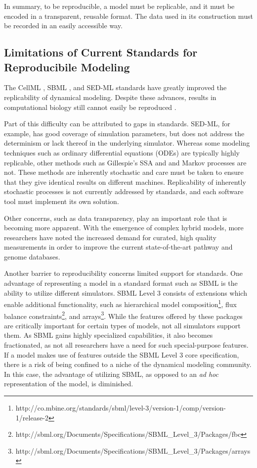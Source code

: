 \documentclass[journal,transmag,twoside]{IEEEtran}
\begin{document}
In summary, to be reproducible, a model must be replicable, and it must be encoded
in a transparent, reusable format. The data used in its construction must be
recorded in an easily accessible way.

\subsection{Limitations of Current Standards for Reproducibile Modeling}

The CellML \cite{cuellar2003overview}, SBML \cite{hucka2003}, and SED-ML \cite{sedml2011} standards have greatly improved the replicability of dynamical modeling.
Despite these advances, results in computational biology still cannot easily be reproduced \cite{garijo2013quantifying}.

Part of this difficulty can be attributed to gaps in standards.
SED-ML, for example, has good coverage of simulation parameters, but
does not address the determinism or lack thereof in the underlying simulator.
Whereas some modeling techniques such as ordinary differential equations (ODEs)
are typically highly replicable, other methods such as Gillespie's SSA and
and Markov processes are not. These methods are inherently stochastic and care
must be taken to ensure that they give identical results on different machines.
Replicability of inherently stochastic processes is not currently addressed by standards,
and each software tool must implement its own solution.

Other concerns, such as data transparency, play an important role that is becoming more apparent.
With the emergence of complex hybrid models, more researchers have noted the increased demand for curated, high quality measurements in order to improve the current state-of-the-art pathway and genome databases.

Another barrier to reproducibility concerns limited support for standards.
One advantage of representing a model in a standard format such as SBML is the ability
to utilize different simulators.
SBML Level 3 consists of extensions which enable additional
functionality, such as
hierarchical model composition\footnote{http://co.mbine.org/standards/sbml/level-3/version-1/comp/version-1/release-2},
flux balance constraints\footnote{ http://sbml.org/Documents/Specifications/SBML\_Level\_3/Packages/fbc}, and
arrays\footnote{http://sbml.org/Documents/Specifications/SBML\_Level\_3/Packages/arrays}.
While the features offered by these packages are critically important for certain
types of models, not all simulators support them.
As SBML gains highly specialized capabilities, it also becomes fractionated, as
not all researchers have a need for such special-purpose features.
If a model makes use of features outside the SBML Level 3 core specification,
there is a risk of being confined to a niche of the dynamical modeling community.
In this case, the advantage of utilizing SBML, as opposed to an \textit{ad hoc} representation
of the model, is diminished.
\end{document}
